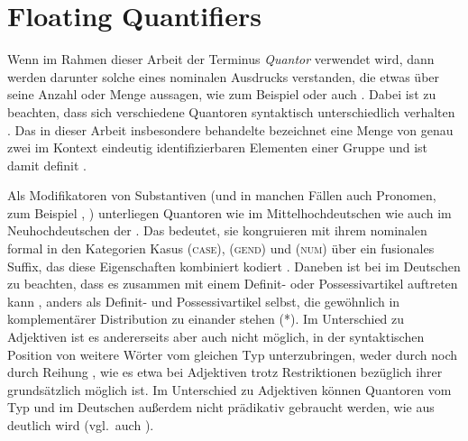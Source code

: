 

\section{Floating Quantifiers}
\label{sec:floatquant}

Wenn im Rahmen dieser Arbeit der Terminus \textit{Quantor} verwendet wird, dann
werden darunter solche  eines nominalen Ausdrucks
verstanden, die etwas über seine Anzahl oder Menge aussagen, wie zum Beispiel
 oder auch . Dabei ist zu beachten, dass
sich verschiedene Quantoren syntaktisch unterschiedlich verhalten
\autocites[27--28]{pittner1995}[11--12]{haspelmath1997}. Das in dieser Arbeit
insbesondere behandelte  bezeichnet eine Menge von genau
zwei im Kontext eindeutig identifizierbaren Elementen einer Gruppe
\autocite[vgl.][307]{keenan2006} und ist damit definit
\autocite[265--268]{lyons1999}.

Als Modifikatoren von Substantiven (und in
manchen Fällen auch Pronomen, zum Beispiel , )
unterliegen Quantoren wie  im
Mittelhochdeutschen wie auch  im
Neuhochdeutschen der . Das
bedeutet, sie kongruieren mit ihrem nominalen 
formal in den Kategorien Kasus (\textsc{case}),
 (\textsc{gend}) und  (\textsc{num}) über ein
fusionales Suffix, das diese Eigenschaften kombiniert kodiert
\autocites(vgl.~auch ,
)[181--184]{ksw2}[772]{woellstein2022}. Daneben ist bei
 im Deutschen zu beachten, dass es zusammen mit
einem Definit- oder Possessivartikel auftreten kann
, anders als Definit- und Possessivartikel selbst, die
gewöhnlich in komplementärer Distribution zu
einander stehen (*). Im Unterschied zu
Adjektiven ist es andererseits aber auch nicht möglich,
in der syntaktischen Position von  weitere Wörter vom gleichen Typ
unterzubringen, weder durch   noch durch
Reihung , wie es etwa bei Adjektiven
trotz Restriktionen bezüglich ihrer  grundsätzlich möglich ist. Im
Unterschied zu Adjektiven können Quantoren vom Typ
 und  im Deutschen außerdem nicht
prädikativ gebraucht werden, wie aus  deutlich wird
(vgl.~auch \cite[181, Fußnote~1]{merchant1996}).

